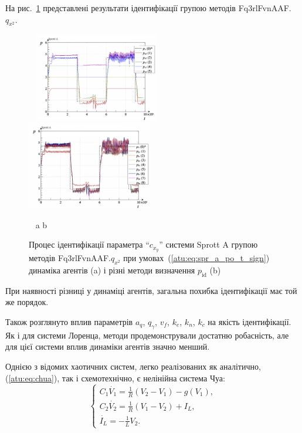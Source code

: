 \documentclass[a4paper,13pt]{atuaref}
\begin{document}
На рис.~\ref{atu:f:spr_a_id_Fq3rlFvnAAF.q_x2_sign}
представлені результати ідентифікації групою методів
Fq3rlFvnAAF.$q_{x^2}$.


\begin{figure}[ht!]
  \centerline{
    ~ \hfill
    \includegraphics[width=0.49\textwidth]{p5/p/cha/spr_a/Fq3rlFvnAAF_x2/sprott_a_id-p_t_pi_Fq3rlFvnAAF_sign_xl.png}
    \hfill
    \includegraphics[width=0.49\textwidth]{p5/p/cha/spr_a/Fq3rlFvnAAF_x2/sprott_a_id-p_t_p_Fq3rlFvnAAF_sign_xl.png}
    \hfill ~
  }
  \vspace{-1.5ex}
  \begin{center}
    ~ \hfill a \hfill\hfill b \hfill ~
  \end{center}
  \vspace{-2.5ex}
  \caption{Процес ідентифікації параметра ``$c_{x_y}$'' системи Sprott A групою методів Fq3rlFvnAAF.$q_{x^2}$ при умовах~(\ref{atu:eq:spr_a_po_t_sign})
  динаміка агентів (a) і різні методи визначення $p_\mathrm{id}$ (b)}
  \label{atu:f:spr_a_id_Fq3rlFvnAAF.q_x2_sign}
\end{figure}

При наявності різниці у динаміці агентів, загальна похибка ідентифікації
має той же порядок.

Також розглянуто вплив параметрів $a_q$, $q_\gamma$, $v_f$, $k_e$, $k_n$, $k_c$
на якість ідентифікації. Як і для системи Лоренца, методи
продемонстрували достатню робасність, але для цієї системи
вплив динаміки агентів значно менший.

Однією з відомих хаотичних систем, легко реалізованих як аналітично,
(\ref{atu:eq:chua}), так і схемотехнічно, є нелінійна система Чуа:
%
\begin{equation}
\begin{cases}
  C_1 \dot{V_1}  = \frac{1}{R} ( V_2 - V_1 ) - g(V_1), \\
  C_2 \dot{V_2}  = \frac{1}{R} ( V_1 - V_2 ) + I_L, \\
  \dot{I_L}      = - \frac{1}{L} V_2 .
\end{cases}
\label{atu:eq:chua}
\end{equation}
\end{document}
